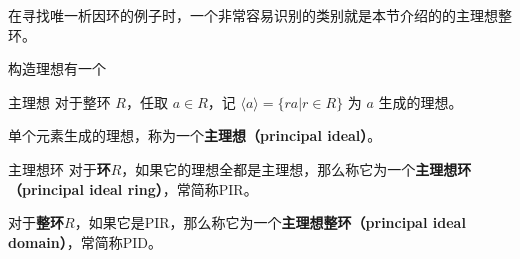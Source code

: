 

在寻找唯一析因环的例子时，一个非常容易识别的类别就是本节介绍的的主理想整环。

构造理想有一个
\begin{definition}{主理想}
对于整环 $R$，任取 $a\in R$，记 $\langle a \rangle=\{ra|r\in R\}$ 为 $a$ 生成的理想。

单个元素生成的理想，称为一个\textbf{主理想（principal ideal）}。
\end{definition}

\begin{definition}{主理想环}
对于\textbf{环}$R$，如果它的理想全都是主理想，那么称它为一个\textbf{主理想环（principal ideal ring）}，常简称PIR。

对于\textbf{整环}$R$，如果它是PIR，那么称它为一个\textbf{主理想整环（principal ideal domain）}，常简称PID。
\end{definition}







